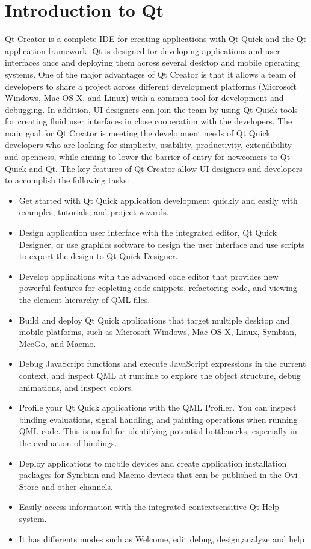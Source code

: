 
\section{Introduction to Qt}

Qt Creator is a complete IDE for creating applications with Qt Quick and the Qt application framework.
Qt  is  designed  for  developing  applications  and  user  interfaces  once  and  deploying  them  across  several
desktop and mobile operating systems.
One  of  the  major  advantages  of  Qt  Creator  is  that  it  allows  a  team  of  developers  to  share  a  project
across  different  development  platforms  (Microsoft  Windows,  Mac  OS  X,  and  Linux)  with  a  common
tool  for  development and debugging. In addition, UI  designers can join the team by using Qt Quick tools
for creating fluid user interfaces in close cooperation with the developers.
The  main  goal  for  Qt  Creator  is  meeting  the  development  needs  of  Qt  Quick  developers  who  are
looking  for  simplicity, usability, productivity, extendibility and openness,  while aiming  to lower the barrier
of  entry  for  newcomers  to  Qt  Quick  and  Qt.  The  key  features  of  Qt  Creator  allow  UI  designers  and
developers to accomplish the following tasks:
\begin{itemize}
\item Get  started  with  Qt  Quick  application  development  quickly  and  easily  with  examples,  tutorials,
and project wizards.
\item Design  application  user  interface  with  the  integrated  editor,  Qt  Quick  Designer,  or  use graphics
software to design the user interface and use scripts to export the design to Qt Quick Designer.
\item Develop  applications   with  the   advanced  code  editor  that  provides  new  powerful  features  for
copleting code snippets, refactoring code, and viewing the element hierarchy of QML files.
\item Build  and  deploy  Qt  Quick  applications  that  target  multiple  desktop and mobile platforms, such
as Microsoft Windows, Mac OS X, Linux, Symbian, MeeGo, and Maemo.
\item Debug  JavaScript  functions  and  execute  JavaScript  expressions  in  the  current  context,   and
inspect QML at runtime to explore the object structure, debug animations, and inspect colors.
\item Profile  your  Qt  Quick  applications  with  the  QML  Profiler.  You can inspect binding evaluations,
signal  handling,  and  painting  operations  when  running  QML  code.  This  is  useful  for  identifying
potential bottlenecks, especially in the evaluation of bindings.
\item Deploy  applications  to  mobile  devices  and  create  application  installation  packages  for  Symbian
and Maemo devices that can be published in the Ovi Store and other channels.
\item Easily access information with the integrated context­sensitive Qt Help system.
\item It has differents modes such as Welcome, edit debug, design,analyze and help
\end{itemize}


